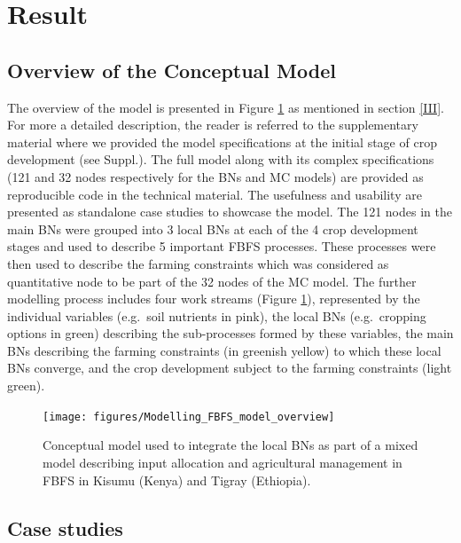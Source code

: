 \documentclass[12pt,oneside]{article}
\begin{document}
\hypertarget{IV}{%
\section{Result}\label{IV}}

\hypertarget{IV1}{%
\subsection{Overview of the Conceptual Model}\label{IV1}}

The overview of the model is presented in Figure \ref{fig:fig4} as mentioned in section \ref{III}. For more a detailed description, the reader is referred to the supplementary material where we provided the model specifications at the initial stage of crop development (see Suppl.). The full model along with its complex specifications (121 and 32 nodes respectively for the BNs and MC models) are provided as reproducible code in the technical material. The usefulness and usability are presented as standalone case studies to showcase the model. The 121 nodes in the main BNs were grouped into 3 local BNs at each of the 4 crop development stages and used to describe 5 important FBFS processes. These processes were then used to describe the farming constraints which was considered as quantitative node to be part of the 32 nodes of the MC model. The further modelling process includes four work streams (Figure \ref{fig:fig4}), represented by the individual variables (e.g.~soil nutrients in pink), the local BNs (e.g.~cropping options in green) describing the sub-processes formed by these variables, the main BNs describing the farming constraints (in greenish yellow) to which these local BNs converge, and the crop development subject to the farming constraints (light green).

\begin{figure}[!htbp]

{\centering \texttt{[image: figures/Modelling\_FBFS\_model\_overview]} 

}

\caption{Conceptual model used to integrate the local BNs as part of a mixed model describing input allocation and agricultural management in FBFS in Kisumu (Kenya) and Tigray (Ethiopia).}\label{fig:fig4}
\end{figure}

\hypertarget{IV2}{%
\subsection{Case studies}\label{IV2}}
\end{document}
